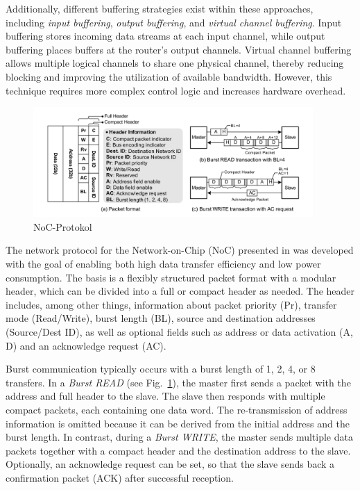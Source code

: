 Additionally, different buffering strategies exist within these approaches, including \textit{input buffering}, \textit{output buffering}, and \textit{virtual channel buffering}. Input buffering stores incoming data streams at each input channel, while output buffering places buffers at the router’s output channels. Virtual channel buffering allows multiple logical channels to share one physical channel, thereby reducing blocking and improving the utilization of available bandwidth. However, this technique requires more complex control logic and increases hardware overhead.

\begin{figure}[htbp]
    \centering
    \includegraphics[width=0.95\textwidth]{img/NoC Protocol.png}
    \caption{NoC-Protokol~\cite{lee_low-power_2006}}\label{fig:NOC_Protocol}
\end{figure}

The network protocol for the Network-on-Chip (NoC) presented in \cite{lee_low-power_2006} was developed with the goal of enabling both high data transfer efficiency and low power consumption. The basis is a flexibly structured packet format with a modular header, which can be divided into a full or compact header as needed. The header includes, among other things, information about packet priority (Pr), transfer mode (Read/Write), burst length (BL), source and destination addresses (Source/Dest ID), as well as optional fields such as address or data activation (A, D) and an acknowledge request (AC).

Burst communication typically occurs with a burst length of 1, 2, 4, or 8 transfers. In a \emph{Burst READ} (see Fig.~\ref{fig:NOC_Protocol}), the master first sends a packet with the address and full header to the slave. The slave then responds with multiple compact packets, each containing one data word. The re-transmission of address information is omitted because it can be derived from the initial address and the burst length. In contrast, during a \emph{Burst WRITE}, the master sends multiple data packets together with a compact header and the destination address to the slave. Optionally, an acknowledge request can be set, so that the slave sends back a confirmation packet (ACK) after successful reception.

